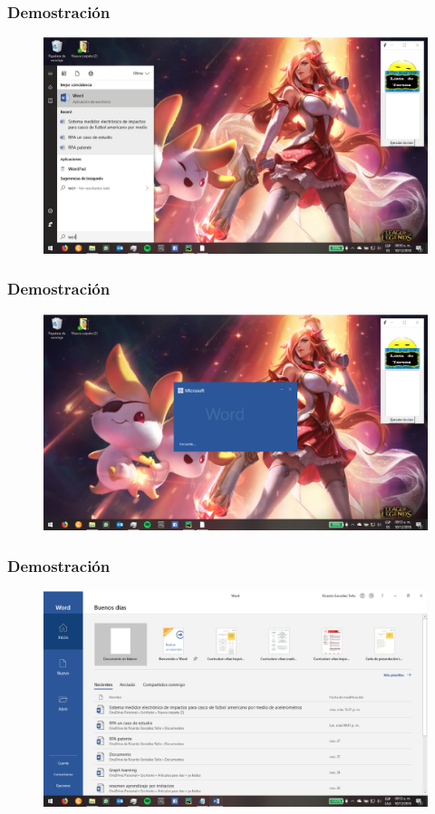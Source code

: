 \begin{frame}
\frametitle{Demostraci\'on}
\begin{figure}[H]
\centering
\includegraphics[width=1.0\columnwidth]{Imagenes/2.eps}
\end{figure}
\end{frame}

\begin{frame}
\frametitle{Demostraci\'on}
\begin{figure}[H]
\centering
\includegraphics[width=1.0\columnwidth]{Imagenes/3.eps}
\end{figure}
\end{frame}

\begin{frame}
\frametitle{Demostraci\'on}
\begin{figure}[H]
\centering
\includegraphics[width=1.0\columnwidth]{Imagenes/4.eps}
\end{figure}
\end{frame}

